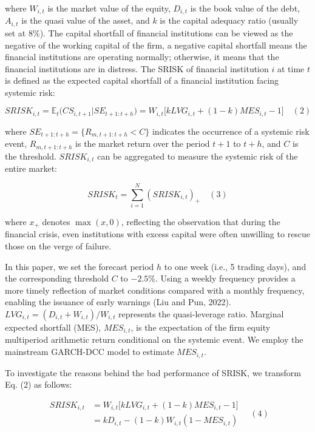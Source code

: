 \documentclass[12pt,a4paper]{article}
\begin{document}
    where $W_{i,t}$ is the market value of the equity, $D_{i,t}$ is the book value of the debt, $A_{i,t}$ is the quasi value of the asset, and $k$ is the capital adequacy ratio (usually set at $8\%$). The capital shortfall of financial institutions can be viewed as the negative of the working capital of the firm, a negative capital shortfall means the financial institutions are operating normally; otherwise, it means that the financial institutions are in distress. The SRISK of financial institution $i$ at time $t$ is defined as the expected capital shortfall of a financial institution facing systemic risk:

    \[
    SRISK_{i,t} = \mathbb{E}_t\big(CS_{i,t+1}\big|SE_{t+1:t+h}\big) = W_{i,t}\big[kLVG_{i,t} + (1-k)MES_{i,t} - 1\big] \quad (2)
    \]

    where $SE_{t+1:t+h} = \{R_{m,t+1:t+h}< C\}$ indicates the occurrence of a systemic risk event, $R_{m,t+1:t+h}$ is the market return over the period $t+1$ to $t+h$, and $C$ is the threshold. $SRISK_{i,t}$ can be aggregated to measure the systemic risk of the entire market:

    \[
    SRISK_{t} = \sum_{i=1}^{N}\left(SRISK_{i,t}\right)_{+} \quad (3)
    \]

    where $x_{+}$ denotes $\max(x,0)$, reflecting the observation that during the financial crisis, even institutions with excess capital were often unwilling to rescue those on the verge of failure.

    In this paper, we set the forecast period $h$ to one week (i.e., 5 trading days), and the corresponding threshold $C$ to $-2.5\%$. Using a weekly frequency provides a more timely reflection of market conditions compared with a monthly frequency, enabling the issuance of early warnings (Liu and Pun, 2022). $LVG_{i,t} = (D_{i,t} + W_{i,t}) / W_{i,t}$ represents the quasi-leverage ratio. Marginal expected shortfall (MES), $MES_{i,t}$, is the expectation of the firm equity multiperiod arithmetic return conditional on the systemic event. We employ the mainstream GARCH-DCC model to estimate $MES_{i,t}$.

    To investigate the reasons behind the bad performance of SRISK, we transform Eq. (2) as follows:

    \[
    \begin{aligned}
    SRISK_{i,t} &= W_{i,t}\big[kLVG_{i,t} + (1-k)MES_{i,t} - 1\big] \\
    &= kD_{i,t} - (1-k)W_{i,t}(1 - MES_{i,t})
    \end{aligned} \quad (4)
    \]
\end{document}
